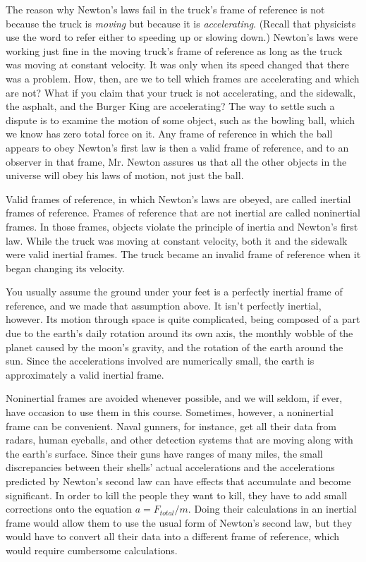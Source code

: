 The reason why Newton's laws fail in the truck's frame of
reference is not because the truck is \emph{moving} but
because it is \emph{accelerating}. (Recall that physicists
use the word to refer either to speeding up or slowing
down.) Newton's laws were working just fine in the moving
truck's frame of reference as long as the truck was moving
at constant velocity. It was only when its speed changed
that there was a problem. How, then, are we to tell which
frames are accelerating and which are not? What if you claim
that your truck is not accelerating, and the sidewalk, the
asphalt, and the Burger King are accelerating? The way to
settle such a dispute is to examine the motion of some
object, such as the bowling ball, which we know has zero
total force on it. Any frame of reference in which the ball
appears to obey Newton's first law is then a valid frame of
reference, and to an observer in that frame, Mr. Newton
assures us that all the other objects in the universe will
obey his laws of motion, not just the ball.

Valid frames of reference, in which Newton's laws are
obeyed, are called inertial frames of reference.  Frames of
reference that are not inertial are called noninertial
frames. In those frames, objects violate the principle of
inertia and Newton's first law. While the truck was moving
at constant velocity, both it and the sidewalk were valid
inertial frames. The truck became an invalid frame of
reference when it began changing its velocity.

You usually assume the ground under your feet is a perfectly
inertial frame of reference, and we made that assumption
above. It isn't perfectly inertial, however. Its motion
through space is quite complicated, being composed of a part
due to the earth's daily rotation around its own axis, the
monthly wobble of the planet caused by the moon's gravity,
and the rotation of the earth around the sun.  Since the
accelerations involved are numerically small, the earth is
approximately a valid inertial frame.

Noninertial frames are avoided whenever possible, and we
will seldom, if ever, have occasion to use them in this
course. Sometimes, however, a noninertial frame can be
convenient. Naval gunners, for instance, get all their data
from radars, human eyeballs, and other detection systems
that are moving along with the earth's surface. Since their
guns have ranges of many miles, the small discrepancies
between their shells' actual accelerations and the
accelerations predicted by Newton's second law can have
effects that accumulate and become significant. In order to
kill the people they want to kill, they have to add small
corrections onto the equation $a=F_{total}/m$. Doing their
calculations in an inertial frame would allow them to use
the usual form of Newton's second law, but they would have
to convert all their data into a different frame of
reference, which would require cumbersome calculations.

